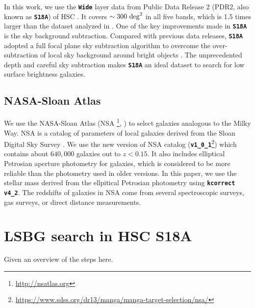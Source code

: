 \documentclass[twocolumn,astrosymb,twocolappendix]{aastex631}
\newcommand{\code}[1]{\textbf{\texttt{#1}}}
\begin{document}
\begin{CJK*}{UTF8}{gbsn}
In this work, we use the \code{Wide} layer data from Public Data Release 2 (PDR2, also known as \code{S18A}) of HSC \citealt{Aihara2018}. It covers $\sim 300\ \rm{deg}^2$ in all five bands, which is 1.5 times larger than the dataset analyzed in . One of the key improvements made in \code{S18A} is the sky background subtraction. Compared with previous data releases, \code{S18A} adopted a full focal plane sky subtraction algorithm to overcome the over-subtraction of local sky background around bright objects \citep{Aihara2018,Li2021}. The unprecedented depth and careful sky subtraction makes \code{S18A} an ideal dataset to search for low surface brightness galaxies. 


\subsection{NASA-Sloan Atlas}
We use the NASA-Sloan Atlas (NSA \footnote{\url{http://nsatlas.org}}, \citealt{Blanton2005,Blanton2011}) to select galaxies analogous to the Milky Way. NSA is a catalog of parameters of local galaxies derived from the Sloan Digital Sky Survey \citep[SDSS,][]{York2000}. We use the new version of NSA catalog (\code{v1\_0\_1}\footnote{\url{https://www.sdss.org/dr13/manga/manga-target-selection/nsa/}}) which contains about $640,000$ galaxies out to $z < 0.15$. It also includes elliptical Petrosian aperture photometry for galaxies, which is considered to be more reliable than the photometry used in older versions. In this paper, we use the stellar mass derived from the ellpitical Petrosian photometry using \code{kcorrect v4\_2}. The redshifts of galaxies in NSA come from several spectroscopic surveys, gas surveys, or direct distance measurements. 



\section{LSBG search in HSC S18A}
Given an overview of the steps here.


\end{CJK*}
\end{document}

